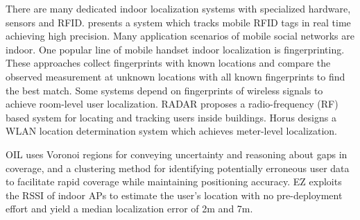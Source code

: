 There are many dedicated indoor localization systems with specialized hardware, \eg sensors and RFID.
\cite{yang2014tagoram} presents a system which tracks mobile RFID tags in real time achieving high precision.
Many application scenarios of mobile social networks are indoor.
One popular line of mobile handset indoor localization is fingerprinting.
These approaches collect fingerprints with known locations
 and compare the observed measurement at unknown locations with
 all known fingerprints to find the best match.
Some systems depend on fingerprints of wireless signals to achieve room-level user localization.
RADAR \cite{bahl2000radar} proposes a radio-frequency (RF) based system
 for locating and tracking users inside buildings.
Horus \cite{youssef2008horus} designs a WLAN location determination system
 which achieves meter-level localization.

OIL \cite{park2010growing} uses Voronoi regions for conveying uncertainty and reasoning about gaps in coverage, and a clustering method for identifying potentially erroneous user data to facilitate rapid coverage while maintaining positioning accuracy.
EZ \cite{chintalapudi2010indoor} exploits the RSSI of indoor APs to estimate the user's location with no pre-deployment effort and yield a median localization error of 2m and 7m.



